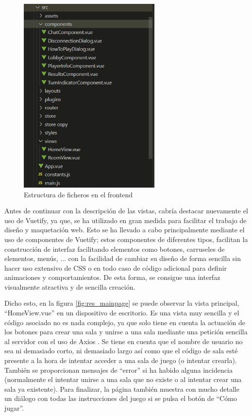 \begin{figure}[h]
	\centering
	\includegraphics[height=10cm,clip=true]{res_estructFronted.png}
	\caption{Estructura de ficheros en el frontend}
	\label{fig:res_estructFronted}
\end{figure}

Antes de continuar con la descripción de las vistas, cabría destacar nuevamente el uso de Vuetify, ya que, se ha utilizado en gran medida para facilitar 
el trabajo de diseño y maquetación web. Esto se ha llevado a cabo principalmente mediante el uso de componentes de Vuetify; estos componentes de diferentes tipos, facilitan la
construcción de interfaz facilitando elementos como botones, carruseles de elementos, menús, ... con la facilidad de cambiar su diseño de forma sencilla sin hacer uso
extensivo de CSS o en todo caso de código adicional para definir animaciones y comportamientos. De esta forma, se consigue una interfaz visualmente atractiva y de sencilla
creación.

Dicho esto, en la figura \ref{fig:res_mainpage} se puede observar la vista principal, ``HomeView.vue'' en un dispositivo de escritorio. Es una vista muy sencilla y el código asociado no
es nada complejo, ya que solo tiene en cuenta la actuación de los botones para crear una sala y unirse a una sala mediante una petición sencilla al servidor con el uso de Axios \cite{vueAxios}. 
Se tiene en cuenta que el nombre de usuario no sea ni demasiado corto, ni demasiado largo así como que el código de sala esté presente a la hora de intentar acceder a una sala de juego 
(o intentar crearla). También se proporcionan mensajes de ``error'' si ha habido alguna incidencia (normalmente el intentar unirse a una sala que no existe o al intentar crear una sala ya existente). 
Para finalizar, la página también muestra con mucho detalle un diálogo con todas las instrucciones del juego si se pulsa el botón de ``Cómo jugar''.

